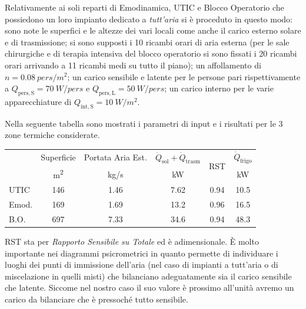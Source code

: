 Relativamente ai soli reparti di Emodinamica, UTIC e Blocco Operatorio che possiedono un loro impianto dedicato a \emph{tutt'aria} si è proceduto in questo modo:
sono note le superfici e le altezze dei vari locali come anche il carico esterno solare e di trasmissione; si sono supposti i \num{10} ricambi orari di aria esterna (per le sale chirurgiche e di terapia intensiva del blocco operatorio si sono fissati i \num{20} ricambi orari arrivando a \num{11} ricambi medi su tutto il piano); un affollamento di $n=\SI{0.08}{pers/m^2}$; un carico sensibile e latente per le persone pari rispettivamente a $Q_{\mathrm{pers,S}}=\SI{70}{W/pers}$ e $Q_{\mathrm{pers,L}}=\SI{50}{W/pers}$; un carico interno per le varie apparecchiature di $Q_{\mathrm{int,S}}=\SI{10}{W/m^2}$. 

Nella seguente tabella sono mostrati i parametri di input e i risultati per le 3 zone termiche considerate.
\begin{center}
	\begin{tabular}{lccccc}
		\toprule
					&	Superficie 				&	Portata Aria Est. 			&	$\dot{Q}_{\mathrm{sol}}+\dot{Q}_{\mathrm{trasm}}$		& 	\multirow{2}{*}{RST}		&	$\dot{Q}_{\mathrm{frigo}}$ 	\\
					&	{\small \si{m^2}}		&		{\small \si{kg/s}}		&		{\small \si{kW}}				&								&{\small \si{kW}}		\\					
		\midrule	
		UTIC		&		\num{146}			&		\num{1.46}				&	\num{7.62}		&	0.94					&	\num{10.5}		\\
		Emod.		&		\num{169}			&		\num{1.69}				&	\num{13.2}		&	0.96					&	\num{16.5}		\\
		B.O.		&	\num{697}				&		\num{7.33}				&	\num{34.6}		&	0.94					&	\num{48.3}		\\
		\bottomrule
	\end{tabular}
\end{center}
RST sta per \emph{Rapporto Sensibile su Totale} ed è adimensionale. È molto importante nei diagrammi psicrometrici in quanto permette di individuare i luoghi dei punti di immissione dell'aria (nel caso di impianti a tutt'aria o di miscelazione in quelli misti) che bilanciano adeguatamente sia il carico sensibile che latente. Siccome nel nostro caso il suo valore è prossimo all'unità avremo un carico da bilanciare che è pressoché tutto sensibile.

